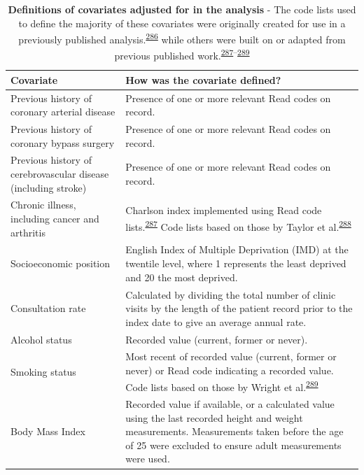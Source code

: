 \documentclass[a4paper, twoside]{templates/ociamthesis}
\begin{document}
\begin{table}[H]

\caption[Definitions of covariates adjusted for in the analysis]{\label{tab:covariateDef-table}\textbf{Definitions of covariates adjusted for in the analysis} - The code lists used to define the majority of these covariates were originally created for use in a previously published analysis.\textsuperscript{\protect\hyperlink{ref-walker2020}{286}} while others were built on or adapted from previous published work.\textsuperscript{\protect\hyperlink{ref-khan2010}{287}--\protect\hyperlink{ref-wright2017}{289}}}
\centering
\fontsize{9}{11}\selectfont
\begin{tabular}[t]{>{\raggedright\arraybackslash}p{15em}>{\centering\arraybackslash}p{25em}}
\toprule
\textbf{Covariate } & \textbf{How was the covariate defined?}\\
\midrule
Previous history of coronary arterial disease & Presence of one or more relevant Read codes on record.\\
\midrule
Previous history of coronary bypass surgery & Presence of one or more relevant Read codes on record.\\
\midrule
Previous history of cerebrovascular disease (including stroke) & Presence of one or more relevant Read codes on record.\\
\midrule
Chronic illness, including cancer and arthritis & Charlson index implemented using Read code lists.\textsuperscript{\protect\hyperlink{ref-khan2010}{287}} Code lists based on those by Taylor et al.\textsuperscript{\protect\hyperlink{ref-taylor2016}{288}}\\
\midrule
Socioeconomic position & 2010 English Index of Multiple Deprivation (IMD) at the twentile level, where 1 represents the least deprived and 20 the most deprived.\\
\midrule
\addlinespace
Consultation rate & Calculated by dividing the total number of clinic visits by the length of the patient record prior to the index date to give an average annual rate.\\
\midrule
Alcohol status & Recorded value (current, former or never).\\
\midrule
Smoking status & Most recent of recorded value (current, former or never) or Read code indicating a recorded value. Code lists based on those by Wright et al.\textsuperscript{\protect\hyperlink{ref-wright2017}{289}}\\
\midrule
Body Mass Index & Recorded value if available, or a calculated value using the last recorded height and weight measurements. Measurements taken before the age of 25 were excluded to ensure adult measurements were used.\\

\end{tabular}
\end{table}
\end{document}

